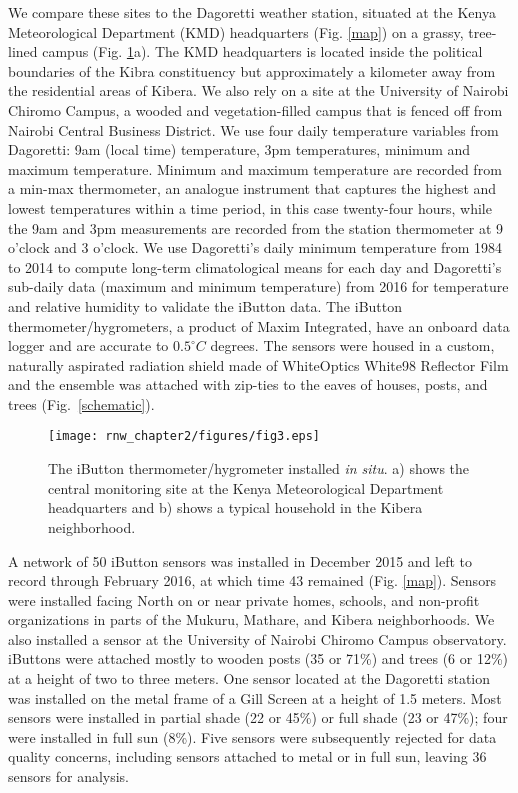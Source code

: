  We compare these sites to the Dagoretti weather station, situated at the Kenya Meteorological Department (KMD) headquarters (Fig. \ref{map}) on a grassy, tree-lined campus (Fig. \ref{photos}a). The KMD headquarters is located inside the political boundaries of the Kibra constituency but approximately a kilometer away from the residential areas of Kibera.  We also rely on a site at the University of Nairobi Chiromo Campus, a wooded and vegetation-filled campus that is fenced off from Nairobi Central Business District. We use four daily temperature variables from Dagoretti: 9am (local time)  temperature, 3pm temperatures, minimum and maximum temperature. Minimum and maximum temperature are recorded from a min-max thermometer, an analogue instrument that captures the highest and lowest temperatures within a time period, in this case twenty-four hours, while the 9am and 3pm measurements are recorded from the station thermometer at 9 o'clock and 3 o'clock. 
We use Dagoretti's daily minimum temperature from 1984 to 2014 to compute long-term climatological means for each day and Dagoretti's sub-daily data (maximum and minimum temperature) from 2016 for temperature and relative humidity to validate the iButton data. The iButton thermometer/hygrometers, a product of Maxim Integrated, have an onboard data logger and are accurate to $0.5^\circ C$ degrees. The sensors were housed in a custom, naturally aspirated radiation shield made of WhiteOptics White98 Reflector Film and the ensemble was attached with zip-ties to the eaves of houses, posts, and trees (Fig.~\ref{schematic}). 

\begin{figure}
\centering
\texttt{[image: rnw\_chapter2/figures/fig3.eps]}
\caption{The iButton thermometer/hygrometer installed \textit{in situ}. a) shows the central monitoring site at the Kenya Meteorological Department headquarters and b) shows a typical household in the Kibera neighborhood. }
\label{photos}
\end{figure}

A network of 50 iButton sensors was installed in December 2015 and left to record through February 2016, at which time 43 remained (Fig. \ref{map}). Sensors were installed facing North on or near private homes, schools, and non-profit organizations in parts of the Mukuru, Mathare, and Kibera neighborhoods. We also installed a sensor at the University of Nairobi Chiromo Campus observatory. iButtons were attached mostly to wooden posts (35 or 71\%) and trees (6 or 12\%) at a height of two to three meters. One sensor located at the Dagoretti station was installed on the metal frame of a Gill Screen at a height of 1.5 meters.  Most sensors were installed in partial shade (22 or 45\%) or  full shade (23 or 47\%); four were installed in full sun (8\%). 
Five sensors were subsequently rejected for data quality concerns, including sensors attached to metal or in full sun, leaving 36 sensors for analysis.

